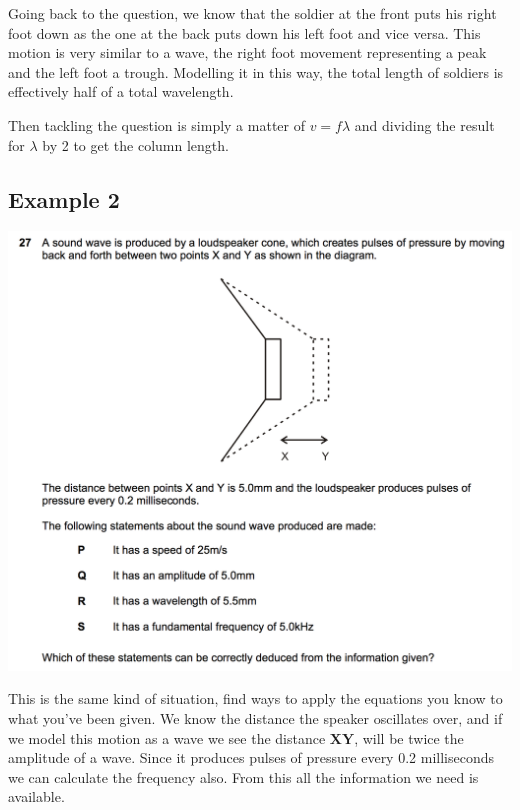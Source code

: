 \documentclass[11pt, titlepage]{article}
\begin{document}
Going back to the question, we know that the soldier at the front puts his right foot down as the one at the back puts down his left foot and vice versa.  This motion is very similar to a wave, the right foot movement representing a peak and the left foot a trough.  Modelling it in this way, the total length of soldiers is effectively half of a total wavelength.  

Then tackling the question is simply a matter of $v=f \lambda$ and dividing the result for $\lambda$ by 2 to get the column length.  

\subsection*{Example 2}

\includegraphics[width=\textwidth]{2012q27}

This is the same kind of situation, find ways to apply the equations you know to what you've been given.  We know the distance the speaker oscillates over, and if we model this motion as a wave we see the distance $\textbf{XY}$, will be twice the amplitude of a wave.  Since it produces pulses of pressure every 0.2 milliseconds we can calculate the frequency also.  From this all the information we need is available.
\end{document}
